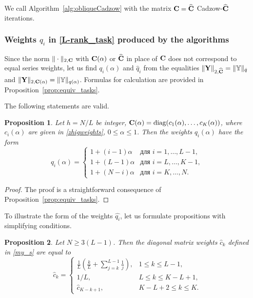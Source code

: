 \documentclass[sii]{ipart}
\newtheorem{proposition}{Proposition}
\begin{document}


We call Algorithm~\ref{alg:obliqueCadzow} with the matrix $\mathbf{C}=\widehat{\mathbf{C}}$ Cadzow-$\widehat{\mathbf{C}}$ iterations.

\subsubsection{Weights $q_i$ in \eqref{L-rank_task} produced by the algorithms}
Since the norm $\|\cdot\|_{2, \mathbf{C}}$ with $\mathbf{C}(\alpha)$ or $\widehat{\mathbf{C}}$ in place of $\mathbf{C}$ does not correspond to equal series weights,
let us find $q_i(\alpha)$ and $\hat{q}_i$ from the equalities
$\|\mathbf{Y}\|_{2,\widehat{\mathbf{C}}}=\|\mathbb{Y}\|_{\hat{q}}$ and $\|\mathbf{Y}\|_{2,\mathbf{C}(\alpha)}=\|\mathbb{Y}\|_{q(\alpha)}$.
Formulas for calculation are provided in Proposition~\ref{prop:equiv_tasks}.

The following statements are valid.

\begin{proposition}\label{prop:zhigconseq}
	Let $h = N/L$ be integer, $\mathbf{C}(\alpha) = \mathop{\mathrm{diag}}(c_1(\alpha), \ldots, c_K(\alpha))$, where $c_i(\alpha)$ are given in \eqref{zhigweights}, $0 \le \alpha \le 1$. Then the weights $q_i(\alpha)$ have the form
	\begin{equation*}
	q_i (\alpha) = \begin{cases}
	1 + (i - 1) \alpha & \text{для $i = 1, \ldots, L-1,$}\\
	1 + (L - 1) \alpha & \text{для $i = L, \ldots, K-1,$}\\
	1 + (N - i) \alpha & \text{для $i = K, \ldots, N.$}
	\end{cases}
	\end{equation*}
\end{proposition}
\begin{proof}
	The proof is a straightforward consequence of Proposition~\ref{prop:equiv_tasks}.
\end{proof}

To illustrate the form of the weights $\hat{q_i}$, let us formulate propositions with simplifying conditions.
\begin{proposition} \label{myweightstat}
	Let $N \ge 3(L-1)$. Then the diagonal matrix weights $\hat c_k$ defined in \eqref{my_s} are equal to
	\begin{equation*}
	\hat c_k = \begin{cases}
	\frac{1}{L}\left(\frac{k}{L} + \sum_{j=k}^{L-1} \frac{1}{j} \right),& 1 \le k \le L-1, \\
	1/L, & L \le k \le K - L + 1,\\
	\hat c_{K - k + 1}, & K - L + 2 \le k \le K.
 	          \end{cases}
	\end{equation*}
\end{proposition}
\end{document}
